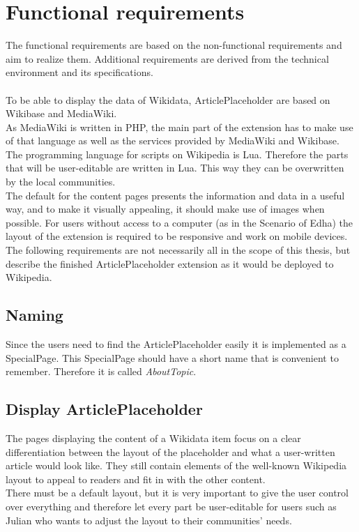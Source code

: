 \chapter {Functional requirements}

The functional requirements are based on the non-functional requirements and aim to realize them. Additional requirements are derived from the technical environment and its specifications. \\
\\
To be able to display the data of Wikidata, ArticlePlaceholder are based on Wikibase and MediaWiki. \\
As MediaWiki is written in PHP, the main part of the extension has to make use of that language as well as the services provided by MediaWiki and Wikibase. \\
The programming language for scripts on Wikipedia is Lua. Therefore the parts that will be user-editable are written in Lua. This way they can be overwritten by the local communities. \\
The default for the content pages presents the information and data in a useful way, and to make it visually appealing, it should make use of images when possible.
For users without access to a computer (as in the Scenario of Edha) the layout of the extension is required to be responsive and work on mobile devices. \\
The following requirements are not necessarily all in the scope of this thesis, but describe the finished ArticlePlaceholder extension as it would be deployed to Wikipedia.

\section{Naming}
Since the users need to find the ArticlePlaceholder easily it is implemented as a SpecialPage. This SpecialPage should have a short name that is convenient to remember. Therefore it is called \textit{AboutTopic}.

\section{Display ArticlePlaceholder}
The pages displaying the content of a Wikidata item focus on a clear differentiation between the layout of the placeholder and what a user-written article would look like. They still contain elements of the well-known Wikipedia layout to appeal to readers and fit in with the other content. \\
There must be a default layout, but it is very important to give the user control over everything and therefore let every part be user-editable for users such as Julian who wants to adjust the layout to their communities' needs.

